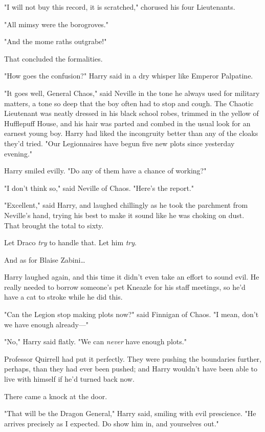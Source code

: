 "I will not buy this record, it is scratched," chorused his four Lieutenants.

"All mimsy were the borogroves."

"And the mome raths outgrabe!"

That concluded the formalities.

"How goes the confusion?" Harry said in a dry whisper like Emperor Palpatine.

"It goes well, General Chaos," said Neville in the tone he always used for
military matters, a tone so deep that the boy often had to stop and cough. The
Chaotic Lieutenant was neatly dressed in his black school robes, trimmed in the
yellow of Hufflepuff House, and his hair was parted and combed in the usual
look for an earnest young boy. Harry had liked the incongruity better than any
of the cloaks they'd tried. "Our Legionnaires have begun five new plots since
yesterday evening."

Harry smiled evilly. "Do any of them have a chance of working?"

"I don't think so," said Neville of Chaos. "Here's the report."

"Excellent," said Harry, and laughed chillingly as he took the parchment from
Neville's hand, trying his best to make it sound like he was choking on dust.
That brought the total to sixty.

Let Draco \emph{try} to handle that. Let him \emph{try}.

And as for Blaise Zabini{\ldots}

Harry laughed again, and this time it didn't even take an effort to sound evil.
He really needed to borrow someone's pet Kneazle for his staff meetings, so
he'd have a cat to stroke while he did this.

"Can the Legion stop making plots now?" said Finnigan of Chaos. "I mean, don't
we have enough already---"

"No," Harry said flatly. "We can \emph{never} have enough plots."

Professor Quirrell had put it perfectly. They were pushing the boundaries
further, perhaps, than they had ever been pushed; and Harry wouldn't have been
able to live with himself if he'd turned back now.

There came a knock at the door.

"That will be the Dragon General," Harry said, smiling with evil prescience.
"He arrives precisely as I expected. Do show him in, and yourselves out."

